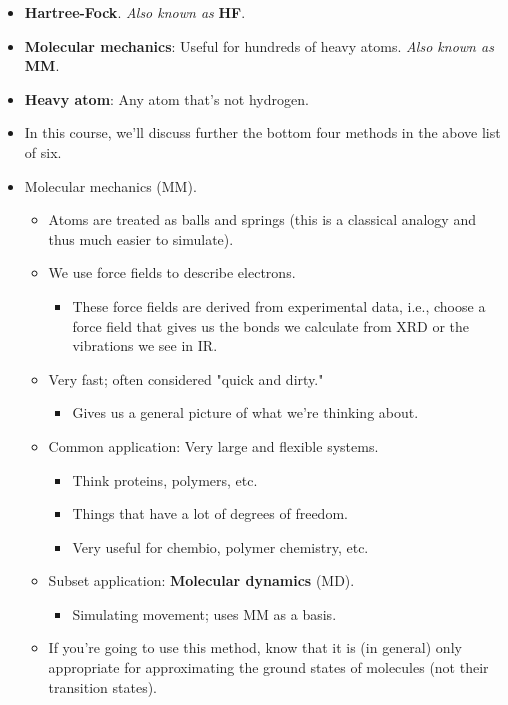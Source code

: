 \documentclass[../notes.tex]{subfiles}
\begin{document}
\begin{itemize}
    \item \textbf{Hartree-Fock}. \emph{Also known as} \textbf{HF}.
    \item \textbf{Molecular mechanics}: Useful for hundreds of heavy atoms. \emph{Also known as} \textbf{MM}.
    \item \textbf{Heavy atom}: Any atom that's not hydrogen.
    \item In this course, we'll discuss further the bottom four methods in the above list of six.
    \item Molecular mechanics (MM).
    \begin{itemize}
        \item Atoms are treated as balls and springs (this is a classical analogy and thus much easier to simulate).
        \item We use force fields to describe electrons.
        \begin{itemize}
            \item These force fields are derived from experimental data, i.e., choose a force field that gives us the bonds we calculate from XRD or the vibrations we see in IR.
        \end{itemize}
        \item Very fast; often considered "quick and dirty."
        \begin{itemize}
            \item Gives us a general picture of what we're thinking about.
        \end{itemize}
        \item Common application: Very large and flexible systems.
        \begin{itemize}
            \item Think proteins, polymers, etc.
            \item Things that have a lot of degrees of freedom.
            \item Very useful for chembio, polymer chemistry, etc.
        \end{itemize}
        \item Subset application: \textbf{Molecular dynamics} (MD).
        \begin{itemize}
            \item Simulating movement; uses MM as a basis.
        \end{itemize}
        \item If you're going to use this method, know that it is (in general) only appropriate for approximating the ground states of molecules (not their transition states).

\end{itemize}
\end{itemize}
\end{document}
